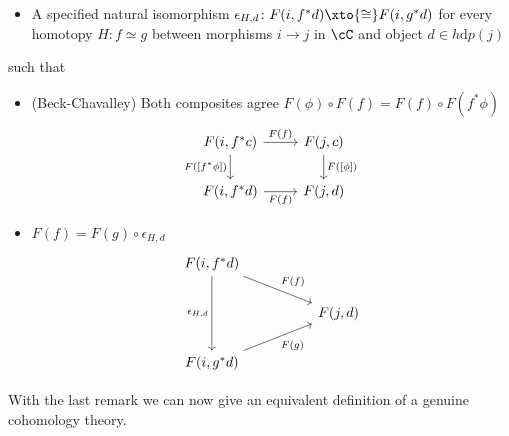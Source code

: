 \begin{remark}
\begin{itemize}
    \item A specified natural isomorphism $\epsilon_{H,d} \colon F(i,f^*d) \xto{\cong} F(i, g^*d)$ for every homotopy $H \colon f \simeq g$ between morphisms 
    $ i \to j $ in $\cC$ and object $d \in h {\mathrm{d}} p(j)$
  \end{itemize}
  such that 
  \begin{itemize}
    \item (Beck-Chavalley) Both composites agree $F(\phi) \circ F(f) = F(f) \circ F(f^*\phi)$
    \[\begin{tikzcd}
      {F(i,f^*c)} & {F(j, c)} \\
      {F(i,f^*d)} & {F(j,d)}
      \arrow["{F([f^*\phi])}"', from=1-1, to=2-1]
      \arrow["{F(f)}"', from=2-1, to=2-2]
      \arrow["{F(f)}", from=1-1, to=1-2]
      \arrow["{F([\phi])}", from=1-2, to=2-2]
    \end{tikzcd}\]
    \item $F(f) = F(g) \circ \epsilon_{H,d}$
    \[\begin{tikzcd}
      {F(i,f^*d)} \\
      && {F(j,d)} \\
      {F(i,g^*d)}
      \arrow["{\epsilon_{H,d}}"', from=1-1, to=3-1]
      \arrow["{F(f)}", from=1-1, to=2-3]
      \arrow["{F(g)}"', from=3-1, to=2-3]
    \end{tikzcd}\]
  \end{itemize}
  \end{remark}
  With the last remark we can now give an equivalent definition of a 
  genuine cohomology theory. 
  
